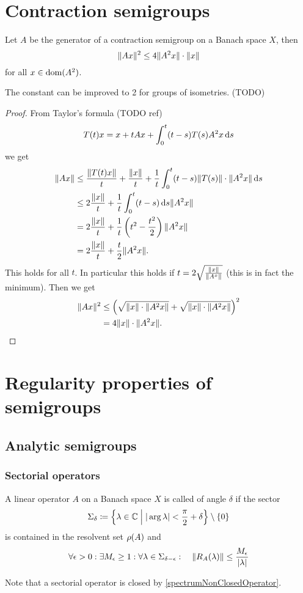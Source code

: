 \section{Contraction semigroups}

\begin{proposition}
Let $A$ be the generator of a contraction semigroup on a Banach space $X$, then
\[ \lVert Ax\rVert^2 \leq 4 \lVert A^2x\rVert\cdot\lVert x\rVert \]
for all $x\in\operatorname{dom}(A^2)$.
\end{proposition}
The constant can be improved to 2 for groups of isometries. (TODO)
\begin{proof}
From Taylor's formula (TODO ref)
\[ T(t)x = x + tAx + \int_0^t(t-s)T(s)A^2x \operatorname{d \!}{s} \]
we get
\begin{align*}
\lVert Ax\rVert &\leq \frac{\lVert T(t)x\rVert}{t} + \frac{\lVert x\rVert}{t} + \frac{1}{t}\int_0^t(t-s)\lVert T(s)\rVert\cdot\lVert A^2x\rVert\operatorname{d \!}{s} \\
&\leq 2\frac{\lVert x\rVert}{t} + \frac{1}{t}\int_0^t(t-s)\operatorname{d \!}{s}\lVert A^2x\rVert \\
&= 2\frac{\lVert x\rVert}{t} + \frac{1}{t}\left(t^2 - \frac{t^2}{2}\right)\lVert A^2x\rVert \\
&= 2\frac{\lVert x\rVert}{t} + \frac{t}{2}\lVert A^2x\rVert.
\end{align*}
This holds for all $t$. In particular this holds if $t = 2\sqrt{\frac{\lVert x\rVert}{\lVert A^x\rVert}}$ (this is in fact the minimum). Then we get
\begin{align*}
\lVert Ax\rVert^2 &\leq \left(\sqrt{\lVert x\rVert\cdot\lVert A^2x\rVert} + \sqrt{\lVert x\rVert\cdot\lVert A^2x\rVert}\right)^2 \\
&= 4\lVert x\rVert\cdot\lVert A^2x\rVert.
\end{align*}
\end{proof}

\section{Regularity properties of semigroups}
\subsection{Analytic semigroups}
\subsubsection{Sectorial operators}
\begin{definition}
A linear operator $A$ on a Banach space $X$ is called  of angle $\delta$ if the sector
\[ \Sigma_\delta \coloneqq \left\{ \lambda\in\mathbb{C} \;\middle|\; |\arg\lambda| < \frac{\pi}{2}+\delta \right\}\setminus \{0\} \]
is contained in the resolvent set $\rho(A)$ and
\[ \forall \epsilon >0: \exists M_\epsilon \geq 1: \forall \lambda\in \Sigma_{\delta-\epsilon}: \quad \lVert R_A(\lambda)\rVert \leq \frac{M_\epsilon}{|\lambda|} \]
\end{definition}
Note that a sectorial operator is closed by \ref{spectrumNonClosedOperator}.

